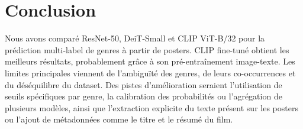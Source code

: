 \documentclass[10pt,a4paper]{article}
\begin{document}
\section{Conclusion}

Nous avons comparé ResNet-50, DeiT-Small et CLIP ViT-B/32 pour la prédiction multi-label de genres à partir de posters.
CLIP fine-tuné obtient les meilleurs résultats, probablement grâce à son pré-entraînement image-texte.
Les limites principales viennent de l'ambiguïté des genres, de leurs co-occurrences et du déséquilibre du dataset.
Des pistes d'amélioration seraient l'utilisation de seuils spécifiques par genre, la calibration des probabilités ou l'agrégation de plusieurs modèles, ainsi que l'extraction explicite du texte présent sur les posters ou l'ajout de métadonnées comme le titre et le résumé du film.

{\footnotesize


}
\end{document}
